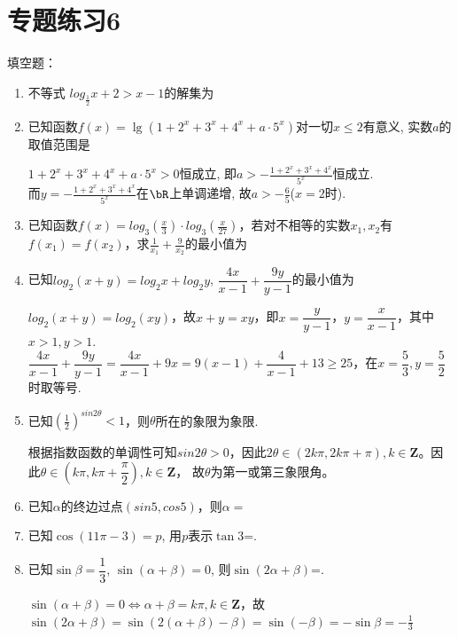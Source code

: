 \chapter*{专题练习6}
填空题：
\begin{enumerate}
    \item 不等式 $log_{\frac{1}{2}}x+2 > x-1$的解集为
    \item 已知函数$f(x)=\lg(1+2^x+3^x+4^x+a\cdot5^x)$对一切$x\leq 2$有意义, 实数$a$的取值范围是
    \begin{jieda}
    $1+2^x+3^x+4^x+a\cdot5^x>0$恒成立, 即$a>-\frac{1+2^x+3^x+4^x}{5^x}$恒成立. \\
    而$y=-\frac{1+2^x+3^x+4^x}{5^x}$在$\bR$上单调递增, 故$a>-\frac{6}{5}$($x=2$时). 
    \end{jieda}
    \item 已知函数$f(x) = log_3(\frac{x}{3}) \cdot log_3(\frac{x}{27})$，若对不相等的实数$x_1, x_2$有$f(x_1) = f(x_2)$，求$\frac{1}{x_1} + \frac{9}{x_2}$的最小值为
    \item 已知$log_2(x+y) = log_2x+log_2y$, $\dfrac{4x}{x-1} + \dfrac{9y}{y-1}$的最小值为
    \begin{jieda}
        $log_2(x+y) = log_2(xy)$，故$x+y = xy$，即$x = \dfrac{y}{y-1}$，$y = \dfrac{x}{x-1}$，其中$x > 1, y > 1$.\\
        $\dfrac{4x}{x-1} + \dfrac{9y}{y-1} = \dfrac{4x}{x-1} + 9x = 9(x-1) + \dfrac{4}{x-1}+13 \geq 25$，在$x = \dfrac{5}{3}, y = \dfrac{5}{2}$时取等号.
    \end{jieda}
    \item 已知$(\frac{1}{2})^{sin2\theta} < 1$，则$\theta$所在的象限为象限.
    \begin{jieda}
        根据指数函数的单调性可知$sin2\theta > 0$，因此$2\theta \in (2k\pi, 2k\pi+\pi), k \in \mathbf{Z}$。因此$\theta \in (k\pi, k\pi+\dfrac{\pi}{2}), k \in \mathbf{Z}$， 故$\theta$为第一或第三象限角。
    \end{jieda}
    \item 已知$\alpha$的终边过点$(sin5, cos5)$，则$\alpha = $
    \item 已知$\cos(11\pi-3)=p$, 用$p$表示$\tan3$=. 
    \item 已知$\sin\beta=\dfrac{1}{3}$, $\sin(\alpha+\beta)=0$, 则$\sin(2\alpha+\beta)$=. 
    \begin{jieda}
    $\sin(\alpha+\beta)=0\iff\alpha+\beta=k\pi, k \in \mathbf{Z}$，故 $\sin(2\alpha+\beta) = \sin(2(\alpha+\beta) - \beta) = \sin(-\beta) = -\sin\beta = -\frac{1}{3}$

\end{jieda}
\end{enumerate}
